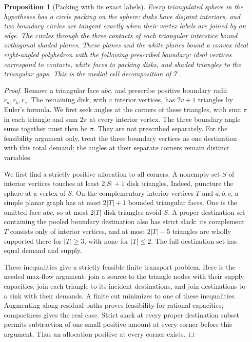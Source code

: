 \documentclass[11pt]{article}
\numberwithin{equation}{section}
\newtheorem{proposition}[theorem]{Proposition}
\theoremstyle{definition}
\theoremstyle{remark}
\begin{document}
\begin{proposition}[Packing with its exact labels]\label{mf:packing}
Every triangulated sphere in the hypotheses has a circle packing on
the sphere: disks have disjoint interiors, and two boundary circles
are tangent exactly when their vertex labels are joined by an edge. The circles through the
three contacts of each triangular interstice bound orthogonal shaded
planes. These planes and the white planes bound a convex ideal
right-angled polyhedron with the following prescribed boundary: ideal vertices correspond to
contacts, white faces to packing disks, and shaded triangles to the
triangular gaps. This is the medial cell decomposition of $\mathcal T$.
\end{proposition}
\begin{proof}
Remove a triangular face \(abc\), and prescribe positive boundary
radii \(r_a,r_b,r_c\). The remaining disk, with \(v\) interior
vertices, has \(2v+1\) triangles by Euler's formula.
We first seek angles at the corners of these triangles, with sum
\(\pi\) in each triangle and sum \(2\pi\) at every interior
vertex. The three boundary angle sums together must then be
\(\pi\). They are not prescribed separately. For the feasibility
argument only, treat the three boundary vertices as one destination
with this total demand; the angles at their separate corners remain
distinct variables.

We first find a strictly positive allocation to all corners.
A nonempty set \(S\) of interior vertices touches at least
\(2|S|+1\) disk triangles. Indeed, puncture the sphere at a vertex
of \(S\). On the complementary interior vertices \(T\) and \(a,b,c\),
a simple planar graph has at most \(2|T|+1\) bounded triangular
faces. One is the omitted face \(abc\), so at most \(2|T|\) disk
triangles avoid \(S\). A proper destination set containing the pooled
boundary destination also has strict slack: its complement \(T\)
consists only of interior vertices, and at most \(2|T|-5\) triangles
are wholly supported there for \(|T|\ge3\), with none for
\(|T|\le2\). The full destination set has equal demand and supply.

These inequalities give a strictly feasible finite transport problem.
Here is the needed max-flow argument: join a source to the triangle nodes with their supply
capacities, join each triangle to its incident destinations, and join
destinations to a sink with their demands. A finite cut minimizes to
one of these inequalities. Augmenting along residual paths proves
feasibility for rational capacities; compactness gives the real case.
Strict slack at every proper destination subset permits subtraction
of one small positive amount at every corner before this argument.
Thus an allocation positive at every corner exists.


\end{proof}
\end{document}

